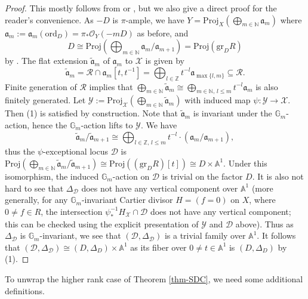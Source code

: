 \documentclass[12pt]{amsart}
\theoremstyle{definition}
\newtheorem{defn}[prop]{Definition}
\newcommand{\bA}{\mathbb{A}}
\newcommand{\bZ}{\mathbb{Z}}
\newcommand{\bN}{\mathbb{N}}
\newcommand{\bG}{\mathbb{G}}
\newcommand{\cO}{\mathcal{O}}
\newcommand{\cR}{\mathcal{R}}
\newcommand{\scX}{\mathscr{X}}
\newcommand{\scY}{\mathscr{Y}}
\newcommand{\scD}{\mathscr{D}}
\newcommand{\fa}{\mathfrak{a}}
\newcommand{\Proj}{\mathrm{Proj}}
\newcommand{\ord}{\mathrm{ord}}
\newcommand{\gr}{\mathrm{gr}}
\numberwithin{equation}{section}
\begin{document}
\begin{proof}
This mostly follows from \cite{LX-Kol-comp-stab} or \cite[Proposition 4.6]{XZ-SDC}, but we also give a direct proof for the reader's convenience. As $-D$ is $\pi$-ample, we have $Y = \Proj_X \left( \bigoplus_{m\in \bN} \fa_m \right)$ where $\fa_m := \fa_m(\ord_D) = \pi_* \cO_Y(-mD)$ as before, and $$D\cong \Proj(\bigoplus_{m\in\bN} \fa_m/\fa_{m+1})=\Proj(\gr_D R)$$ by \cite[Proposition 2.10]{LZ-Tian-sharpness}. The flat extension $\widetilde{\fa}_m$ of $\fa_m$ to $\scX$ is given by
\[
\widetilde{\fa}_m = \cR\cap \fa_m[t,t^{-1}] = \bigoplus_{l\in\bZ} t^{-l} \fa_{\max\{l,m\}} \subseteq \cR.
\]
Finite generation of $\cR$ implies that $\bigoplus_{m\in \bN} \widetilde{\fa}_m\cong \bigoplus_{m\in\bN,\,l\le m} t^{-l}\fa_m$ is also finitely generated. Let $\scY:=\Proj_{\scX} \left( \bigoplus_{m\in \bN} \widetilde{\fa}_m \right)$ with induced map $\psi\colon \scY\to \scX$. Then (1) is satisfied by construction. Note that $\widetilde{\fa}_m$ is invariant under the $\bG_m$-action, hence the $\bG_m$-action lifts to $\scY$. We have
\[
\widetilde{\fa}_m/\widetilde{\fa}_{m+1} \cong \bigoplus_{l\in \bZ,\,l\le m} t^{-l}\cdot (\fa_m/\fa_{m+1}),
\]
thus the $\psi$-exceptional locus $\scD$ is 
$\Proj(\bigoplus_{m\in \bN} \widetilde{\fa}_m/\widetilde{\fa}_{m+1})\cong \Proj((\gr_D R)[t])\cong D\times \bA^1$. Under this isomorphism, the induced $\bG_m$-action on $\scD$ is trivial on the factor $D$. It is also not hard to see that $\Delta_{\scD}$ does not have any vertical component over $\bA^1$ (more generally, for any $\bG_m$-invariant Cartier divisor $H=(f=0)$ on $X$, where $0\neq f\in R$, the intersection $\psi_*^{-1}H_{\scX}\cap \scD$ does not have any vertical component; this can be checked using the explicit presentation of $\scY$ and $\scD$ above). Thus as  $\Delta_{\scD}$ is $\bG_m$-invariant, we see that $(\scD, \Delta_{\scD})$ is a trivial family over $\bA^1$. It follows that $(\scD, \Delta_{\scD})\cong (D, \Delta_D) \times \bA^1$ as its fiber over $0\neq t\in \bA^1$ is $(D,\Delta_D)$ by (1).
\end{proof}

To unwrap the higher rank case of Theorem \ref{thm-SDC}, we need some additional definitions.

\end{document}
